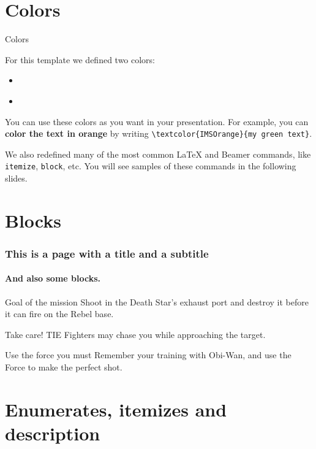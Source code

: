 \documentclass[usenames,dvipsnames,10pt,aspectratio=169]{beamer}
\begin{document}
\section{Colors}

\begin{frame}{Colors}

For this template we defined two colors:
\begin{itemize}
\item \textcolor{white}{}
\item \textcolor{white}{}
\end{itemize}

\vskip 0.5cm

You can use these colors as you want in your presentation. For example, you can \textbf{\textcolor{IMSOrange}{color the text in orange}} by writing \texttt{\textbackslash textcolor\{IMSOrange\}\{my green text\}}.

\vskip 0.5cm

We also redefined many of the most common \LaTeX{} and Beamer commands, like \texttt{itemize}, \texttt{block}, etc. You will see samples of these commands in the following slides.

\end{frame}

\section{Blocks}

\begin{frame} 
\frametitle{This is a page with a title and a subtitle} 
\framesubtitle{And also some blocks.} 
\begin{block}{Goal of the mission}
Shoot in the Death Star's exhaust port and destroy it before it can fire on the Rebel base.
\end{block} 
\begin{alertblock}{Take care!}
TIE Fighters may chase you while approaching the target.
\end{alertblock} 
\begin{exampleblock}{Use the force you must}
Remember your training with Obi-Wan, and use the Force to make the perfect shot.
\end{exampleblock} 

\end{frame}

\section{Enumerates, itemizes and description}
\end{document}
